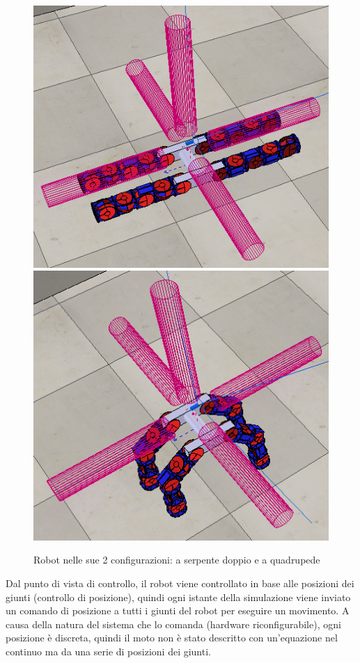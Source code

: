 \documentclass[a4paper,titlepage]{book}
\begin{document}
\begin{figure}[htbp]
\centering
\includegraphics[scale=0.3]{tobor_sdraiato.png}
\qquad\qquad
\includegraphics[scale=0.3]{tobor_quadrupede.png}
\caption{Robot nelle sue 2 configurazioni: a serpente doppio e a quadrupede}\label{fig:71}
\end{figure}

Dal punto di vista di controllo, il robot viene controllato in base alle posizioni dei giunti (controllo di posizione), quindi ogni istante della simulazione viene inviato un comando di posizione a tutti i giunti del robot per eseguire un movimento.
A causa della natura del sistema che lo comanda (hardware riconfigurabile), ogni posizione è discreta, quindi il moto non è stato descritto con un'equazione nel continuo ma da una serie di posizioni dei giunti.
\end{document}
